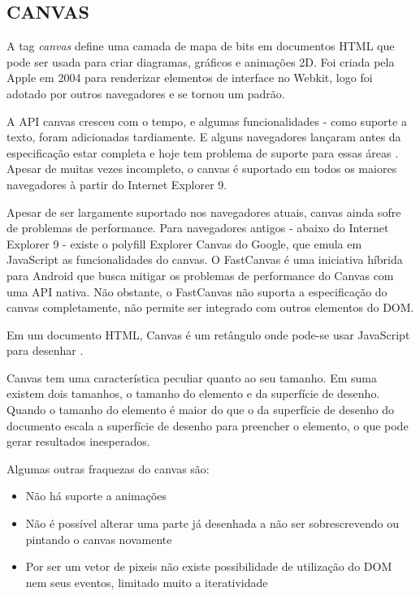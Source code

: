 \subsection{CANVAS}

A tag \textit{canvas} define uma camada de mapa de bits em documentos
HTML que pode ser usada para criar diagramas, gráficos e animações
2D. Foi criada pela Apple em 2004 para renderizar elementos de interface
no Webkit, logo foi adotado por outros navegadores e se tornou um
padrão.

A API canvas cresceu com o tempo, e algumas funcionalidades - como
suporte a texto, foram adicionadas tardiamente. E alguns navegadores
lançaram antes da especificação estar completa e hoje tem problema
de suporte para essas áreas \autocite{diveIntohtml}. Apesar de muitas
vezes incompleto, o canvas é suportado em todos os maiores navegadores
à partir do Internet Explorer 9.

Apesar de ser largamente suportado nos navegadores atuais, canvas ainda
sofre de problemas de performance. Para navegadores antigos - abaixo do
Internet Explorer 9 - existe o polyfill Explorer Canvas do Google, que
emula em JavaScript as funcionalidades do canvas. O FastCanvas é uma
iniciativa híbrida para Android que busca mitigar os problemas de
performance do Canvas com uma API nativa. Não obstante, o FastCanvas
não suporta a especificação do canvas completamente, não permite ser
integrado com outros elementos do DOM.

Em um documento HTML, Canvas é um retângulo onde pode-se usar
JavaScript para desenhar \autocite[pp. 113]{diveIntohtml}.

Canvas tem uma característica peculiar quanto ao seu tamanho.
Em suma existem dois tamanhos, o tamanho do elemento e da superfície de
desenho. Quando o tamanho do elemento é maior do que o da superfície
de desenho do documento escala a superfície de desenho para preencher o
elemento, o que pode gerar resultados inesperados.

Algumas outras fraquezas do canvas são:
\begin{itemize}
\item{Não há suporte a animações}
\item{Não é possível alterar uma parte já desenhada a não ser sobrescrevendo ou pintando o canvas novamente}
\item{Por ser um vetor de pixeis não existe possibilidade de utilização do DOM nem seus eventos, limitado muito a iteratividade}
\end{itemize}

